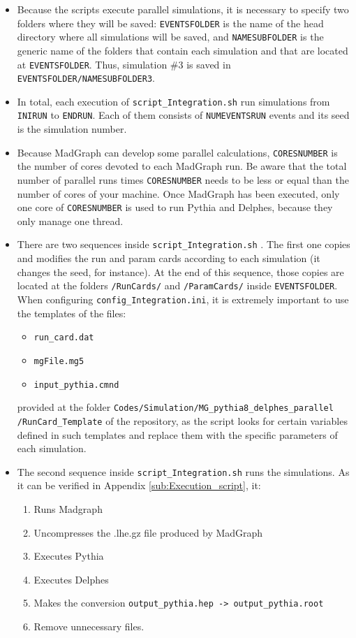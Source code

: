 \documentclass[12pt, oneside]{book}              %
\begin{document}
\begin{itemize}
\item Because the scripts execute parallel simulations, it
is necessary to specify two folders where they will be saved:
\texttt{EVENTSFOLDER} is the name of the head directory where all
simulations will be saved, and \texttt{NAMESUBFOLDER} is the generic
name of the folders that contain each simulation and that are 
located at \texttt{EVENTSFOLDER}. Thus, simulation \#3 is saved in 
\texttt{EVENTSFOLDER/NAMESUBFOLDER3}.

\item In total, each execution of \texttt{script\_Integration.sh} run
simulations from \texttt{INIRUN} to \texttt{ENDRUN}. Each of them
consists of \texttt{NUMEVENTSRUN} events and its seed is the simulation
number.

\item Because MadGraph can develop some parallel calculations, 
\texttt{CORESNUMBER} is the number of cores devoted to each MadGraph
run. Be aware that the total number of parallel runs times \texttt{CORESNUMBER}
needs to be less or equal than the number of cores of your machine. 
Once MadGraph has been executed, only one core of \texttt{CORESNUMBER}
is used to run Pythia and Delphes, because they only manage
one thread.

\item There are two sequences inside \texttt{script\_Integration.sh} . The
first one copies and modifies the run and param cards according to
each simulation (it changes the seed, for instance). At the end of this
sequence, those copies are located at the folders \texttt{/RunCards/} and
\texttt{/ParamCards/} inside \texttt{EVENTSFOLDER}. When configuring
\texttt{config\_Integration.ini}, it is extremely important to use the 
templates of the files:
\begin{itemize}
\item \texttt{run\_card.dat}
\item \texttt{mgFile.mg5}
\item \texttt{input\_pythia.cmnd}
\end{itemize}
provided at the folder \texttt{Codes/Simulation/MG\_pythia8\_delphes\_parallel}
\texttt{/RunCard\_Template} of the repository, as the script looks for
certain variables defined in such templates and replace them with
the specific parameters of each simulation.

\item The second sequence inside \texttt{script\_Integration.sh} runs the
simulations. As it can be verified in Appendix \ref{sub:Execution_script},
it:
\begin{enumerate}
\item Runs Madgraph
\item Uncompresses the .lhe.gz file produced by MadGraph
\item Executes Pythia
\item Executes Delphes
\item Makes the conversion \texttt{output\_pythia.hep -> output\_pythia.root}
\item Remove unnecessary files.
\end{enumerate}


\end{itemize}
\end{document}

